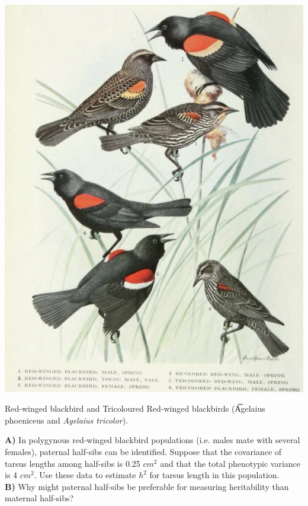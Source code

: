\begin{marginfigure}
\begin{center}
\includegraphics[width=\textwidth]{illustration_images/Quant_gen/red_winged_blackbirds/Red_wing_blackbirds.png}
\end{center}
\caption{Red-winged blackbird and Tricoloured Red-winged blackbirds
  ({\t Agelaius phoeniceus} and {\it Agelaius tricolor}). }\label{fig:RW_blackbird}
\end{marginfigure}
 
\begin{question}
{\bf A)} In polygynous red-winged blackbird populations (i.e. males mate with
several females), paternal half-sibs can be identified.  Suppose that
the covariance of tarsus lengths among half-sibs is 0.25 $cm^2$ and
that the total phenotypic variance is 4 $cm^2$.  Use these data to
estimate $h^2$ for tarsus length in this population. \\

{\bf B)} Why might paternal half-sibs be preferable for measuring
heritability than maternal half-sibs? 
\end{question}

